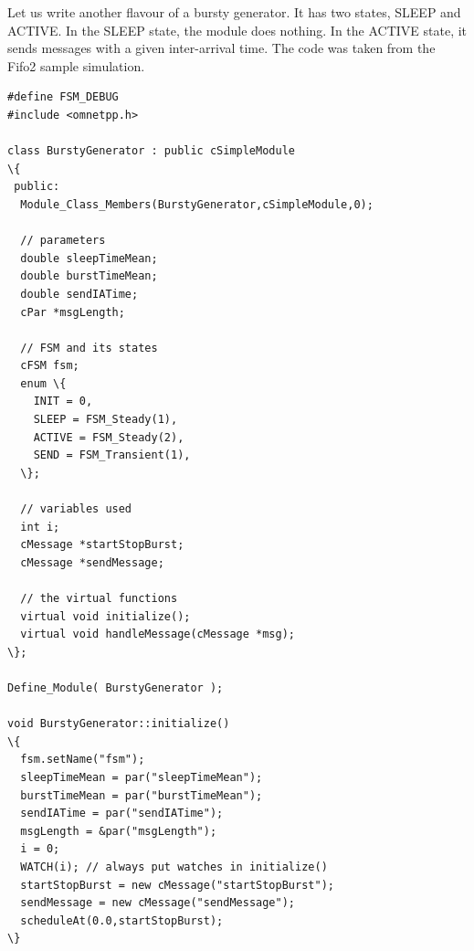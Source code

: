 Let us write another flavour of a bursty generator. It has two
states, SLEEP and ACTIVE. In the SLEEP state, the module does
nothing. In the ACTIVE state, it sends messages with a given
inter-arrival time. The code was taken from the Fifo2 sample
simulation.


\begin{Verbatim}[commandchars=\\\{\}]
#define FSM_DEBUG
#include <omnetpp.h>

class BurstyGenerator : public cSimpleModule
\{
 public:
  Module_Class_Members(BurstyGenerator,cSimpleModule,0);

  // parameters
  double sleepTimeMean;
  double burstTimeMean;
  double sendIATime;
  cPar *msgLength;

  // FSM and its states
  cFSM fsm;
  enum \{
    INIT = 0,
    SLEEP = FSM_Steady(1),
    ACTIVE = FSM_Steady(2),
    SEND = FSM_Transient(1),
  \};

  // variables used
  int i;
  cMessage *startStopBurst;
  cMessage *sendMessage;

  // the virtual functions
  virtual void initialize();
  virtual void handleMessage(cMessage *msg);
\};

Define_Module( BurstyGenerator );

void BurstyGenerator::initialize()
\{
  fsm.setName("fsm");
  sleepTimeMean = par("sleepTimeMean");
  burstTimeMean = par("burstTimeMean");
  sendIATime = par("sendIATime");
  msgLength = &par("msgLength");
  i = 0;
  WATCH(i); // always put watches in initialize()
  startStopBurst = new cMessage("startStopBurst");
  sendMessage = new cMessage("sendMessage");
  scheduleAt(0.0,startStopBurst);
\}


\end{Verbatim}
